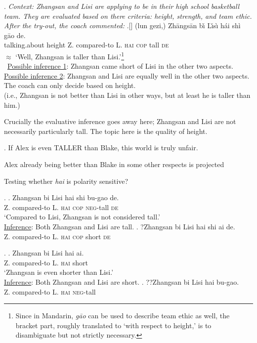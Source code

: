 \documentclass[12pt,letterpaper]{scrartcl}
\begin{document}
\setlength{\SubExleftmargin}{0em}
\ex. \textit{Context: Zhangsan and Lisi are applying to be in their high school basketball team. They are evaluated based on there criteria: height, strength, and team ethic. After the try-out, the coach commented:} 
\ag.[] (lun gezi,) Zh\={a}ngs\={a}n b\v{\i} L\v{\i}s\`{\i} h\'{a}i sh\`{i} g\={a}o de. \\
    		talking.about height Z. compared-to L. \textsc{hai} \textsc{cop} tall \textsc{de} \\
    		$\approx$ `Well, Zhangsan is taller than Lisi.'\footnote{Since in Mandarin, \textit{g\={a}o} can be used to describe team ethic as well, the bracket part, roughly translated to `with respect to height,' is to disambiguate but not strictly necessary.} \\\
    		\underline{Possible inference 1}: Zhangsan came short of Lisi in the other two aspects. \\
    		\underline{Possible inference 2}: Zhangsan and Lisi are equally well in the other two aspects. The coach can only decide based on height. \\
    		(i.e., Zhangsan is not better than Lisi in other ways, but at least he is taller than him.) \label{crucial2}

Crucially the evaluative inference goes away here; Zhangsan and Lisi are not necessarily particularly tall. The topic here is the quality of height.


\ex. If Alex is even TALLER than Blake, this world is truly unfair.

Alex already being better than Blake in some other respects is projected

Testing whether \textit{hai} is polarity sensitive?
    
\ex. \ag. Zhangsan bi Lisi hai shi bu-gao de. \\
    Z. compared-to L. \textsc{hai} \textsc{cop} \textsc{neg}-tall   \textsc{de} \\
    `Compared to Lisi, Zhangsan is not considered tall.' \\
    \underline{Inference}: Both Zhangsan and Lisi are tall.
    \bg. ?Zhangsan bi Lisi hai shi ai de. \\
Z. compared-to L. \textsc{hai} \textsc{cop} short   \textsc{de} \\
{}

\ex. \ag. Zhangsan bi Lisi hai ai. \\
    Z. compared-to L. \textsc{hai} short \\
    `Zhangsan is even shorter than Lisi.’ \\
    \underline{Inference}: Both Zhangsan and Lisi are short.
    \bg. ??Zhangsan bi Lisi hai bu-gao. \\
    Z. compared-to L. \textsc{hai} \textsc{neg}-tall \\
    {}
\end{document}
